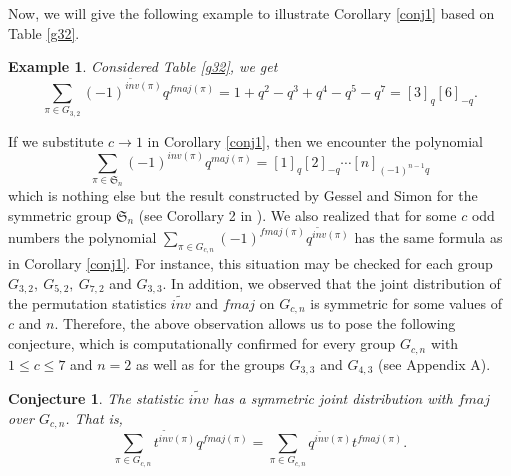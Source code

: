 \documentclass[a4paper,12pt]{article}
\newtheorem{conj}[thm]{Conjecture}
\newtheorem{ex}[thm]{Example}
\begin{document}
Now, we will give the following example to illustrate Corollary \ref{conj1} based on Table \ref{g32}.

\begin{ex}
Considered Table \ref{g32}, we get
$$\sum_{\pi \in G_{3,2}} (-1)^{\widetilde{inv}(\pi)} q^{fmaj(\pi)}=1+q^2-q^3+q^4-q^5-q^7=[3]_q[6]_{-q}.$$
\end{ex}


If we substitute $c \rightarrow 1$ in Corollary \ref{conj1}, then we encounter the polynomial
\begin{equation}\label{gessel-simon}
 \sum_{\pi \in \mathfrak{S}_n} (-1)^{inv(\pi)} q^{maj(\pi)}=[1]_q[2]_{-q}\cdots [n]_{(-1)^{n-1}q} 
\end{equation}
which is nothing else but the result constructed by Gessel and Simon for the symmetric group $\mathfrak{S}_n$ (see Corollary 2 in \cite{wachs1992}). We also realized that  for some $c$ odd numbers the polynomial $\sum_{\pi \in G_{c,n}} (-1)^{fmaj(\pi)} q^{\widetilde{inv}(\pi)}$ has the same formula as in Corollary \ref{conj1}. For instance, this situation may be checked for each group $G_{3,2}, ~G_{5,2},~G_{7,2}$ and $G_{3,3}$. In addition, we observed that the joint distribution of the permutation statistics $\widetilde{inv}$ and $fmaj$ on $G_{c,n}$ is symmetric for some values of $c$ and $n$. Therefore, the above observation allows us to pose the following conjecture, which is computationally confirmed for every group $G_{c,n}$ with $1 \leq c \leq 7$ and $n=2$ as well as for the groups $G_{3,3}$ and $G_{4,3}$ (see Appendix A).



\begin{conj}\label{symjointtilde}
The statistic $\widetilde{inv}$ has a symmetric joint distribution with $fmaj$ over $G_{c,n}$. That is, 
\begin{equation*}
  \sum_{\pi \in G_{c,n}}t^{\widetilde{inv}(\pi)}q^{fmaj(\pi)}=\sum_{\pi \in G_{c,n}}q^{\widetilde{inv}(\pi)}t^{fmaj(\pi)}.  
\end{equation*}
\end{conj} 
\end{document}

